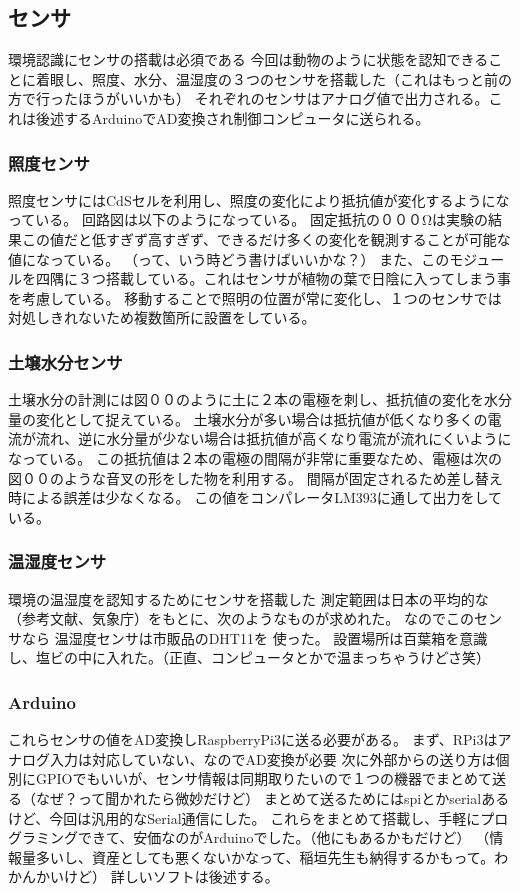 \subsection{センサ}
環境認識にセンサの搭載は必須である
今回は動物のように状態を認知できることに着眼し、照度、水分、温湿度の３つのセンサを搭載した（これはもっと前の方で行ったほうがいいかも）
それぞれのセンサはアナログ値で出力される。これは後述するArduinoでAD変換され制御コンピュータに送られる。
\subsubsection{照度センサ}
照度センサにはCdSセルを利用し、照度の変化により抵抗値が変化するようになっている。
回路図は以下のようになっている。
固定抵抗の０００Ωは実験の結果この値だと低すぎず高すぎず、できるだけ多くの変化を観測することが可能な値になっている。
（って、いう時どう書けばいいかな？）
また、このモジュールを四隅に３つ搭載している。これはセンサが植物の葉で日陰に入ってしまう事を考慮している。
移動することで照明の位置が常に変化し、１つのセンサでは対処しきれないため複数箇所に設置をしている。
\subsubsection{土壌水分センサ}
土壌水分の計測には図００のように土に２本の電極を刺し、抵抗値の変化を水分量の変化として捉えている。
土壌水分が多い場合は抵抗値が低くなり多くの電流が流れ、逆に水分量が少ない場合は抵抗値が高くなり電流が流れにくいようになっている。
この抵抗値は２本の電極の間隔が非常に重要なため、電極は次の図００のような音叉の形をした物を利用する。
間隔が固定されるため差し替え時による誤差は少なくなる。
この値をコンパレータLM393に通して出力をしている。

\subsubsection{温湿度センサ}
環境の温湿度を認知するためにセンサを搭載した
測定範囲は日本の平均的な（参考文献、気象庁）をもとに、次のようなものが求めれた。
なのでこのセンサなら
温湿度センサは市販品のDHT11を
使った。
設置場所は百葉箱を意識し、塩ビの中に入れた。（正直、コンピュータとかで温まっちゃうけどさ笑）
\subsubsection{Arduino}
これらセンサの値をAD変換しRaspberryPi3に送る必要がある。
まず、RPi3はアナログ入力は対応していない、なのでAD変換が必要
次に外部からの送り方は個別にGPIOでもいいが、センサ情報は同期取りたいので１つの機器でまとめて送る（なぜ？って聞かれたら微妙だけど）
まとめて送るためにはspiとかserialあるけど、今回は汎用的なSerial通信にした。
これらをまとめて搭載し、手軽にプログラミングできて、安価なのがArduinoでした。（他にもあるかもだけど）
（情報量多いし、資産としても悪くないかなって、稲垣先生も納得するかもって。わかんかいけど）
詳しいソフトは後述する。
